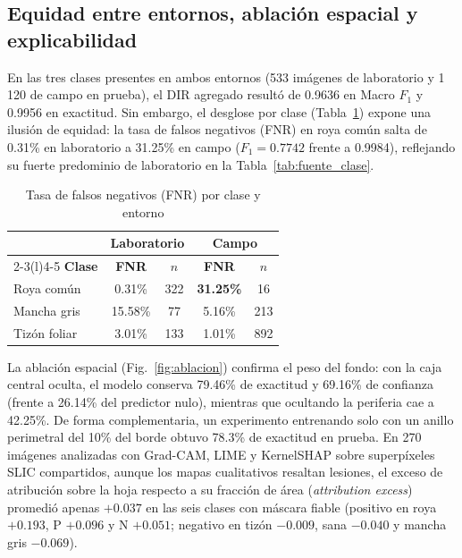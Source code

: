 \documentclass[conference,letterpaper]{IEEEtran}
\newcommand{\Fone}{$F_1$}
\begin{document}
\subsection{Equidad entre entornos, ablación espacial y explicabilidad}
En las tres clases presentes en ambos entornos (533 imágenes de laboratorio y 1\,120 de campo en prueba), el DIR agregado resultó de 0.9636 en Macro \Fone{} y 0.9956 en exactitud. Sin embargo, el desglose por clase (Tabla~\ref{tab:fnr}) expone una ilusión de equidad: la tasa de falsos negativos (FNR) en roya común salta de 0.31\% en laboratorio a 31.25\% en campo ($F_1=0.7742$ frente a 0.9984), reflejando su fuerte predominio de laboratorio en la Tabla~\ref{tab:fuente_clase}.

\begin{table}[!t]
\caption{Tasa de falsos negativos (FNR) por clase y entorno}
\label{tab:fnr}
\centering
\scriptsize
\setlength{\tabcolsep}{4pt}
\begin{tabular}{@{}lcccc@{}}
\toprule
& \multicolumn{2}{c}{\textbf{Laboratorio}} & \multicolumn{2}{c}{\textbf{Campo}} \\
\cmidrule(lr){2-3}\cmidrule(l){4-5}
\textbf{Clase} & \textbf{FNR} & \textbf{$n$} & \textbf{FNR} & \textbf{$n$} \\
\midrule
Roya común & 0.31\% & 322 & \textbf{31.25\%} & 16 \\
Mancha gris & 15.58\% & 77 & 5.16\% & 213 \\
Tizón foliar & 3.01\% & 133 & 1.01\% & 892 \\
\bottomrule
\end{tabular}
\end{table}

La ablación espacial (Fig.~\ref{fig:ablacion}) confirma el peso del fondo: con la caja central oculta, el modelo conserva 79.46\% de exactitud y 69.16\% de confianza (frente a 26.14\% del predictor nulo), mientras que ocultando la periferia cae a 42.25\%. De forma complementaria, un experimento entrenando solo con un anillo perimetral del 10\% del borde obtuvo 78.3\% de exactitud en prueba. En 270 imágenes analizadas con Grad-CAM, LIME y KernelSHAP sobre superpíxeles SLIC compartidos, aunque los mapas cualitativos resaltan lesiones, el exceso de atribución sobre la hoja respecto a su fracción de área (\textit{attribution excess}) promedió apenas $+0.037$ en las seis clases con máscara fiable (positivo en roya $+0.193$, P $+0.096$ y N $+0.051$; negativo en tizón $-0.009$, sana $-0.040$ y mancha gris $-0.069$).
\end{document}
